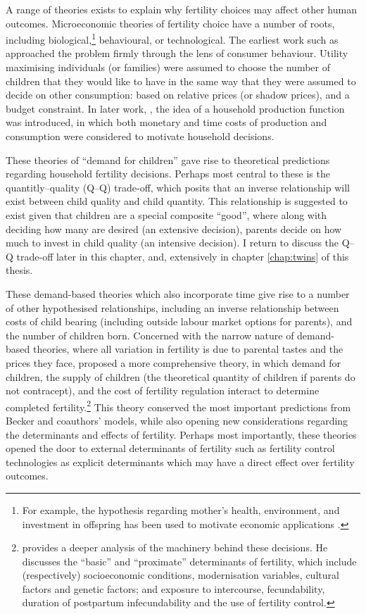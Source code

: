 A range of theories exists to explain why fertility choices may affect other 
human outcomes.  Microeconomic theories of fertility choice have a number of
roots, including biological,\footnote{For example, the \citet{TriversWillard1973}
hypothesis regarding mother's health, environment, and investment in offspring
has been used to motivate economic applications \citep{AlmondEdlund2007}.}
behavioural, or technological. The earliest work such as \citet{Becker1960} 
approached the problem firmly through the lens of consumer behaviour.  Utility 
maximising individuals (or families) were assumed to choose the number of 
children that they would like to have in the same way that they were assumed to 
decide on other consumption: based on relative prices (or shadow prices), and a 
budget constraint.  In later work, \citep{Becker1965}, the idea of a household 
production function was introduced, in which both monetary and time costs of 
production and consumption were considered to motivate household decisions.

These theories of ``demand for children'' gave rise to theoretical predictions 
regarding household fertility decisions.  Perhaps most central to these is the
quantitly--quality (Q--Q) trade-off, which posits that an inverse relationship
will exist between child quality and child quantity.  This relationship is
suggested to exist given that children are a special composite ``good'', where 
along with deciding how many are desired (an extensive decision), parents decide 
on how much to invest in child quality (an intensive decision).  I return to 
discuss the Q--Q trade-off later in this chapter, and, extensively in chapter
\ref{chap:twins} of this thesis.

These demand-based theories which also incorporate time give rise to a number 
of other hypothesised relationships, including an inverse relationship between 
costs of child bearing (including outside labour market options for parents),
and the number of children born.  Concerned with the narrow nature of demand-%
based theories, where all variation in fertility is due to parental tastes and 
the prices they face, \citet{Easterlin1975} proposed a more comprehensive 
theory, in which demand for children, the supply of children (the theoretical
quantity of children if parents do not contracept), and the cost of fertility
regulation interact to determine completed fertility.\footnote{%
\citeauthor{Easterlin1975} provides a deeper analysis of the machinery behind
these decisions.  He discusses the ``basic'' and ``proximate'' determinants
of fertility, which include (respectively) socioeconomic conditions, 
modernisation variables, cultural factors and genetic factors; and exposure to
intercourse, fecundability, duration of postpartum infecundability and the use
of fertility control.} This theory conserved the most important predictions from 
Becker and coauthors' models, while also opening new considerations regarding the 
determinants and effects of fertility.  Perhaps most importantly, these theories 
opened the door to external determinants of fertility such as fertility control 
technologies as explicit determinants which may have a direct effect over 
fertility outcomes.

